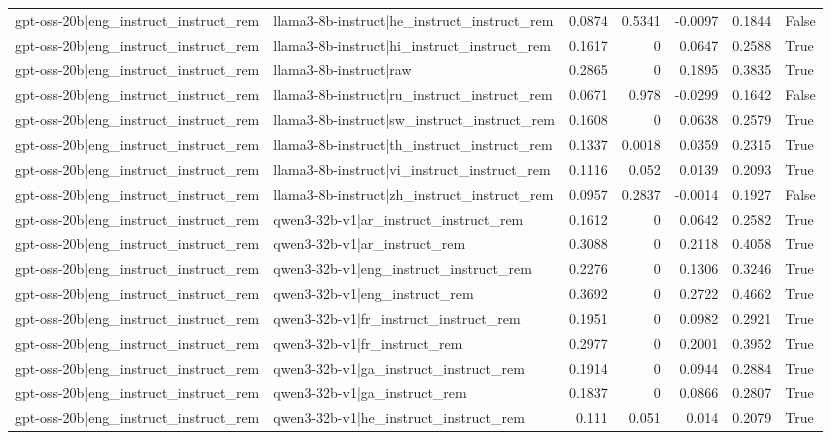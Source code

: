 \begin{table}
\begin{tabular}{l l r r r r l}
gpt-oss-20b|eng_instruct_instruct_rem & llama3-8b-instruct|he_instruct_instruct_rem & 0.0874 & 0.5341 & -0.0097 & 0.1844 & False \\
gpt-oss-20b|eng_instruct_instruct_rem & llama3-8b-instruct|hi_instruct_instruct_rem & 0.1617 & 0 & 0.0647 & 0.2588 & True \\
gpt-oss-20b|eng_instruct_instruct_rem & llama3-8b-instruct|raw & 0.2865 & 0 & 0.1895 & 0.3835 & True \\
gpt-oss-20b|eng_instruct_instruct_rem & llama3-8b-instruct|ru_instruct_instruct_rem & 0.0671 & 0.978 & -0.0299 & 0.1642 & False \\
gpt-oss-20b|eng_instruct_instruct_rem & llama3-8b-instruct|sw_instruct_instruct_rem & 0.1608 & 0 & 0.0638 & 0.2579 & True \\
gpt-oss-20b|eng_instruct_instruct_rem & llama3-8b-instruct|th_instruct_instruct_rem & 0.1337 & 0.0018 & 0.0359 & 0.2315 & True \\
gpt-oss-20b|eng_instruct_instruct_rem & llama3-8b-instruct|vi_instruct_instruct_rem & 0.1116 & 0.052 & 0.0139 & 0.2093 & True \\
gpt-oss-20b|eng_instruct_instruct_rem & llama3-8b-instruct|zh_instruct_instruct_rem & 0.0957 & 0.2837 & -0.0014 & 0.1927 & False \\
gpt-oss-20b|eng_instruct_instruct_rem & qwen3-32b-v1|ar_instruct_instruct_rem & 0.1612 & 0 & 0.0642 & 0.2582 & True \\
gpt-oss-20b|eng_instruct_instruct_rem & qwen3-32b-v1|ar_instruct_rem & 0.3088 & 0 & 0.2118 & 0.4058 & True \\
gpt-oss-20b|eng_instruct_instruct_rem & qwen3-32b-v1|eng_instruct_instruct_rem & 0.2276 & 0 & 0.1306 & 0.3246 & True \\
gpt-oss-20b|eng_instruct_instruct_rem & qwen3-32b-v1|eng_instruct_rem & 0.3692 & 0 & 0.2722 & 0.4662 & True \\
gpt-oss-20b|eng_instruct_instruct_rem & qwen3-32b-v1|fr_instruct_instruct_rem & 0.1951 & 0 & 0.0982 & 0.2921 & True \\
gpt-oss-20b|eng_instruct_instruct_rem & qwen3-32b-v1|fr_instruct_rem & 0.2977 & 0 & 0.2001 & 0.3952 & True \\
gpt-oss-20b|eng_instruct_instruct_rem & qwen3-32b-v1|ga_instruct_instruct_rem & 0.1914 & 0 & 0.0944 & 0.2884 & True \\
gpt-oss-20b|eng_instruct_instruct_rem & qwen3-32b-v1|ga_instruct_rem & 0.1837 & 0 & 0.0866 & 0.2807 & True \\
gpt-oss-20b|eng_instruct_instruct_rem & qwen3-32b-v1|he_instruct_instruct_rem & 0.111 & 0.051 & 0.014 & 0.2079 & True \\

\end{tabular}
\end{table}
